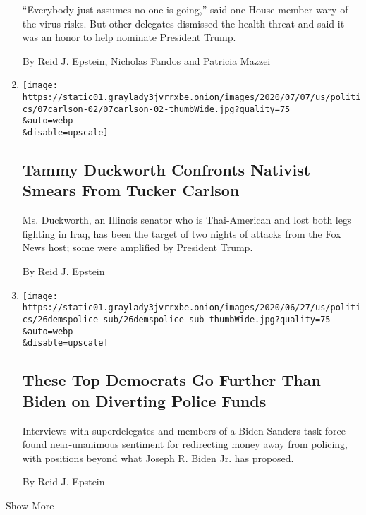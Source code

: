 \begin{enumerate}
  ``Everybody just assumes no one is going,'' said one House member wary
  of the virus risks. But other delegates dismissed the health threat
  and said it was an honor to help nominate President Trump.

  By Reid J. Epstein, Nicholas Fandos and Patricia Mazzei
\item
  \href{/2020/07/08/us/politics/tucker-carlson-tammy-duckworth.html}{}

  \texttt{[image: https://static01.graylady3jvrrxbe.onion/images/2020/07/07/us/politics/07carlson-02/07carlson-02-thumbWide.jpg?quality=75\\\&auto=webp\\\&disable=upscale]}

  \hypertarget{tammy-duckworth-confronts-nativist-smears-from-tucker-carlson}{%
  \subsection{Tammy Duckworth Confronts Nativist Smears From Tucker
  Carlson}\label{tammy-duckworth-confronts-nativist-smears-from-tucker-carlson}}

  Ms. Duckworth, an Illinois senator who is Thai-American and lost both
  legs fighting in Iraq, has been the target of two nights of attacks
  from the Fox News host; some were amplified by President Trump.

  By Reid J. Epstein
\item
  \href{/2020/06/26/us/politics/defund-police-protests-democrats.html}{}

  \texttt{[image: https://static01.graylady3jvrrxbe.onion/images/2020/06/27/us/politics/26demspolice-sub/26demspolice-sub-thumbWide.jpg?quality=75\\\&auto=webp\\\&disable=upscale]}

  \hypertarget{these-top-democrats-go-further-than-biden-on-diverting-police-funds}{%
  \subsection{These Top Democrats Go Further Than Biden on Diverting
  Police
  Funds}\label{these-top-democrats-go-further-than-biden-on-diverting-police-funds}}

  Interviews with superdelegates and members of a Biden-Sanders task
  force found near-unanimous sentiment for redirecting money away from
  policing, with positions beyond what Joseph R. Biden Jr. has proposed.

  By Reid J. Epstein
\end{enumerate}

Show More

